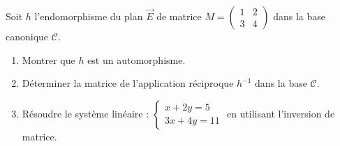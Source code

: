 \documentclass[11pt]{article}
\begin{document}
\begin{exercice}
Soit $h$ l'endomorphisme du plan $\overrightarrow{E}$ de matrice $M = \begin{pmatrix} 1 & 2 \\ 3 & 4 \end{pmatrix}$ dans la base canonique $\mathcal{C}$.
\begin{enumerate}
    \item Montrer que $h$ est un automorphisme.
    \item Déterminer la matrice de l'application réciproque $h^{-1}$ dans la base $\mathcal{C}$.
    \item Résoudre le système linéaire : $\begin{cases} x + 2y = 5 \\ 3x + 4y = 11 \end{cases}$ en utilisant l'inversion de matrice.
\end{enumerate}
\end{exercice}
\end{document}
